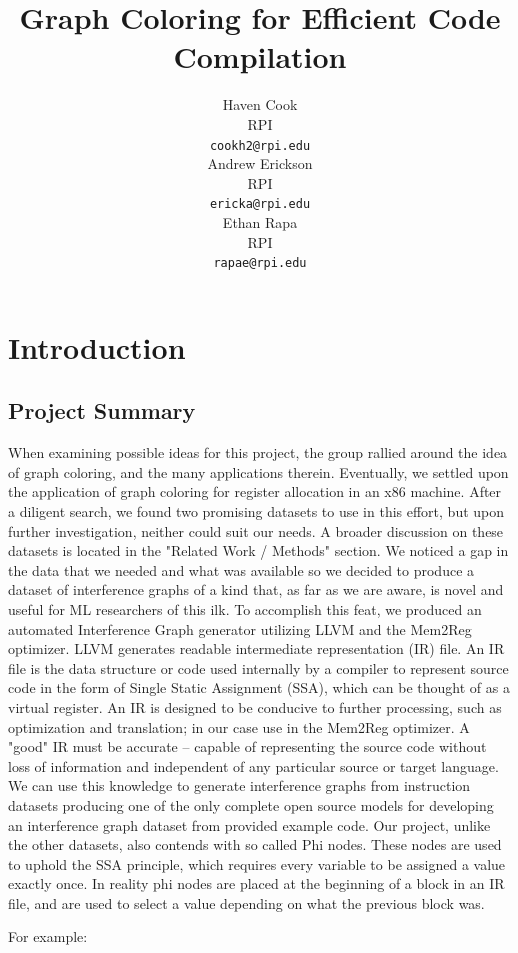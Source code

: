 \documentclass{article}
\title{Graph Coloring for Efficient Code Compilation}
\author{
  Haven Cook \\
    RPI\\
  \texttt{cookh2@rpi.edu} \\
  \And
  Andrew Erickson \\ 
  RPI \\
  \texttt{ericka@rpi.edu} \\
  \And
  Ethan Rapa \\ 
    RPI \\
  \texttt{rapae@rpi.edu} \\
}
\begin{document}
\maketitle


\section{Introduction}
\subsection{Project Summary}

When examining possible ideas for this project, the group rallied around the idea of graph coloring, and the many applications therein. Eventually, we settled upon the application of graph coloring for register allocation in an x86 machine. After a diligent search, we found two promising datasets to use in this effort, but upon further investigation, neither could suit our needs. A broader discussion on these datasets is located in the "Related Work / Methods" section. We noticed a gap in the data that we needed and what was available so we decided to produce a dataset of interference graphs of a kind that, as far as we are aware, is novel and useful for ML researchers of this ilk. To accomplish this feat, we produced an automated Interference Graph generator utilizing LLVM and the Mem2Reg optimizer. LLVM generates readable intermediate representation (IR) file. An IR file is the data structure or code used internally by a compiler to represent source code in the form of Single Static Assignment (SSA), which can be thought of as a virtual register. An IR is designed to be conducive to further processing, such as optimization and translation; in our case use in the Mem2Reg optimizer. A "good" IR must be accurate – capable of representing the source code without loss of information and independent of any particular source or target language. We can use this knowledge to generate interference graphs from instruction datasets producing one of the only complete open source models for developing an interference graph dataset from provided example code. Our project, unlike the other datasets, also contends with so called Phi nodes. These nodes are used to uphold the SSA principle, which requires every variable to be assigned a value exactly once. In reality phi nodes are placed at the beginning of a block in an IR file, and are used to select a value depending on what the previous block was. 

For example:
\end{document}
